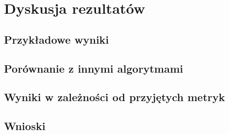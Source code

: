 \chapter{Dyskusja rezultatów}

\section{Przykładowe wyniki}

\section{Porównanie z innymi algorytmami}

\section{Wyniki w zależności od przyjętych metryk}

\section{Wnioski}
